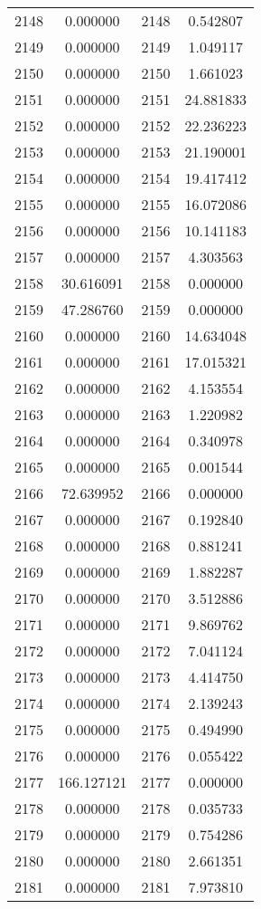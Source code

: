 \documentclass[12pt]{article}
\begin{document}
\begin{longtable}{@{}cccc@{}}
2148 & 0.000000 & 2148 & 0.542807 \\
2149 & 0.000000 & 2149 & 1.049117 \\
2150 & 0.000000 & 2150 & 1.661023 \\
2151 & 0.000000 & 2151 & 24.881833 \\
2152 & 0.000000 & 2152 & 22.236223 \\
2153 & 0.000000 & 2153 & 21.190001 \\
2154 & 0.000000 & 2154 & 19.417412 \\
2155 & 0.000000 & 2155 & 16.072086 \\
2156 & 0.000000 & 2156 & 10.141183 \\
2157 & 0.000000 & 2157 & 4.303563 \\
2158 & 30.616091 & 2158 & 0.000000 \\
2159 & 47.286760 & 2159 & 0.000000 \\
2160 & 0.000000 & 2160 & 14.634048 \\
2161 & 0.000000 & 2161 & 17.015321 \\
2162 & 0.000000 & 2162 & 4.153554 \\
2163 & 0.000000 & 2163 & 1.220982 \\
2164 & 0.000000 & 2164 & 0.340978 \\
2165 & 0.000000 & 2165 & 0.001544 \\
2166 & 72.639952 & 2166 & 0.000000 \\
2167 & 0.000000 & 2167 & 0.192840 \\
2168 & 0.000000 & 2168 & 0.881241 \\
2169 & 0.000000 & 2169 & 1.882287 \\
2170 & 0.000000 & 2170 & 3.512886 \\
2171 & 0.000000 & 2171 & 9.869762 \\
2172 & 0.000000 & 2172 & 7.041124 \\
2173 & 0.000000 & 2173 & 4.414750 \\
2174 & 0.000000 & 2174 & 2.139243 \\
2175 & 0.000000 & 2175 & 0.494990 \\
2176 & 0.000000 & 2176 & 0.055422 \\
2177 & 166.127121 & 2177 & 0.000000 \\
2178 & 0.000000 & 2178 & 0.035733 \\
2179 & 0.000000 & 2179 & 0.754286 \\
2180 & 0.000000 & 2180 & 2.661351 \\
2181 & 0.000000 & 2181 & 7.973810 \\

\end{longtable}
\end{document}
